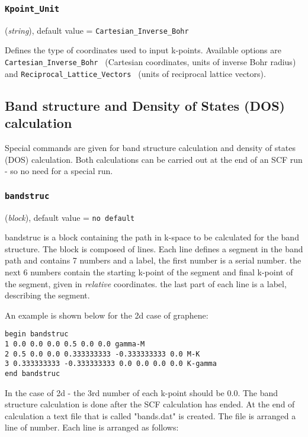 \documentclass{article}
\begin{document}
\subsubsection{\tt Kpoint\_Unit 
\label{KpointUnit}}
({\it string}),
default value = {\tt Cartesian\_Inverse\_Bohr }

Defines the type of coordinates used to input k-points. Available
options are {\tt Cartesian\_Inverse\_Bohr } (Cartesian coordinates,
units of inverse Bohr radius) and {\tt Reciprocal\_Lattice\_Vectors }
(units of reciprocal lattice vectors).











\subsection{Band structure and Density of States (DOS) calculation}

Special commands are given for band structure calculation and density 
of states (DOS) calculation. Both calculations can be carried out at the
end of an SCF run - so no need for a special run. 

\subsubsection{\tt bandstruc
\label{bandstruc}}
({\it block}),
default value = {\tt no default }

bandstruc is a block containing the path in k-space to be calculated 
for the band structure. The block is composed of lines. Each line defines 
a segment in the band path and contains 7 numbers and a label, the first 
number is a serial number. the next 6 numbers contain the starting k-point 
of the segment and final k-point of the segment, given in {\it relative} 
coordinates. the last part of each line is a label, describing the segment. 

An example is shown below for the 2d case of graphene:

\begin{verbatim}
begin bandstruc
1 0.0 0.0 0.0 0.5 0.0 0.0 gamma-M
2 0.5 0.0 0.0 0.333333333 -0.333333333 0.0 M-K
3 0.333333333 -0.333333333 0.0 0.0 0.0 0.0 K-gamma
end bandstruc
\end{verbatim}

In the case of 2d - the 3rd number of each k-point should be $0.0$. The 
band structure calculation is done after the SCF calculation has ended. 
At the end of calculation a text file that is called "bands.dat" is created.
The file is arranged a line of number. Each line is arranged as follows:
\end{document}

